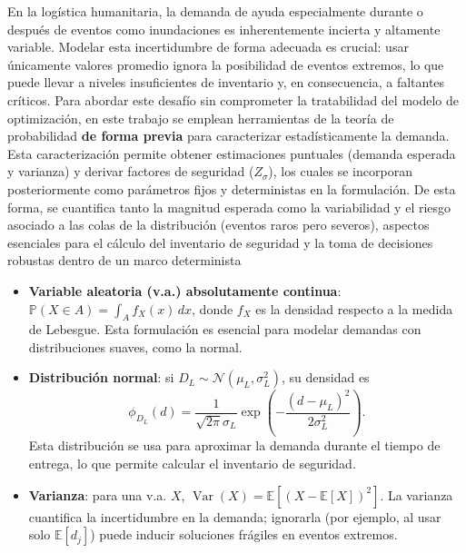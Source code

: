 \documentclass[
  spanish,
  us-letterpaper,
]{scrreprt}
\providecommand{\tightlist}{%
  \setlength{\itemsep}{0pt}\setlength{\parskip}{0pt}}
\numberwithin{equation}{section}
\begin{document}
En la logística humanitaria, la demanda de ayuda especialmente durante o
después de eventos como inundaciones es inherentemente incierta y
altamente variable. Modelar esta incertidumbre de forma adecuada es
crucial: usar únicamente valores promedio ignora la posibilidad de
eventos extremos, lo que puede llevar a niveles insuficientes de
inventario y, en consecuencia, a faltantes críticos. Para abordar este
desafío sin comprometer la tratabilidad del modelo de optimización, en
este trabajo se emplean herramientas de la teoría de probabilidad
\textbf{de forma previa} para caracterizar estadísticamente la demanda.
Esta caracterización permite obtener estimaciones puntuales (demanda
esperada y varianza) y derivar factores de seguridad (\(Z_{\sigma}\)),
los cuales se incorporan posteriormente como parámetros fijos y
deterministas en la formulación. De esta forma, se cuantifica tanto la
magnitud esperada como la variabilidad y el riesgo asociado a las colas
de la distribución (eventos raros pero severos), aspectos esenciales
para el cálculo del inventario de seguridad y la toma de decisiones
robustas dentro de un marco determinista

\begin{itemize}
\tightlist
\item
  \textbf{Variable aleatoria (v.a.) absolutamente continua}:
  \(\mathbb{P}(X \in A) = \int_A f_X(x)\,dx\), donde \(f_X\) es la
  densidad respecto a la medida de Lebesgue. Esta formulación es
  esencial para modelar demandas con distribuciones suaves, como la
  normal.
\item
  \textbf{Distribución normal}: si
  \(D_L \sim \mathcal{N}(\mu_L, \sigma_L^2)\), su densidad es\\
  \[
  \phi_{D_L}(d) = \frac{1}{\sqrt{2\pi}\sigma_L} \exp\!\left(-\frac{(d - \mu_L)^2}{2\sigma_L^2}\right).
  \] Esta distribución se usa para aproximar la demanda durante el
  tiempo de entrega, lo que permite calcular el inventario de seguridad.
\item
  \textbf{Varianza}: para una v.a. \(X\),
  \(\operatorname{Var}(X) = \mathbb{E}[(X - \mathbb{E}[X])^2]\). La
  varianza cuantifica la incertidumbre en la demanda; ignorarla (por
  ejemplo, al usar solo \(\mathbb{E}[d_j]\)) puede inducir soluciones
  frágiles en eventos extremos.
\end{itemize}
\end{document}
